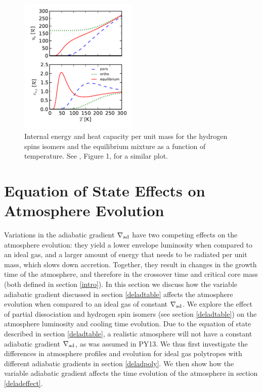 \documentclass[apj]{emulateapj}
\newcommand{\delad}{\nabla_{\rm ad}}
\begin{document}
\begin{figure}[h]
\centering
\includegraphics[width=0.5\textwidth]{../../figs/ModelAtmospheres/RadSelfGravRealEOS/PaperFigs/ortho_para_energy.pdf}
\caption{Internal energy and heat capacity per unit mass for the hydrogen spins isomers and the equilibrium mixture as a function of temperature. See \citet{farkas35}, Figure 1, for a similar plot.}
\label{fig:ucvr}
\end{figure}




\section{Equation of State Effects on Atmosphere Evolution}
\label{EOSeffects}

Variations in the adiabatic gradient $\delad$ have two competing effects on the atmosphere evolution: they yield a lower envelope luminosity when compared to an ideal gas, and a larger amount of energy that needs to be radiated per unit mass, which slows down accretion. Together, they result in changes in the growth time of the atmosphere, and therefore in the crossover time and critical core mass (both defined in section \ref{intro}). In this section we discuss how the variable adiabatic gradient discussed in section \ref{deladtable} affects the atmosphere evolution when compared to an ideal gas of constant $\delad$. We explore the effect of partial dissociation and hydrogen spin isomers (see section \ref{deladtable}) on the atmosphere luminosity and cooling time evolution. Due to the equation of state described in section \ref{deladtable}, a realistic atmosphere will not have a constant adiabatic gradient $\delad$, as was assumed in PY13. We thus first investigate the differences in atmosphere profiles and evolution for ideal gas polytropes with different adiabatic gradients in section \ref{deladpoly}. We then show how the variable adiabatic gradient affects the time evolution of the atmosphere in section \ref{deladeffect}.
\end{document}
